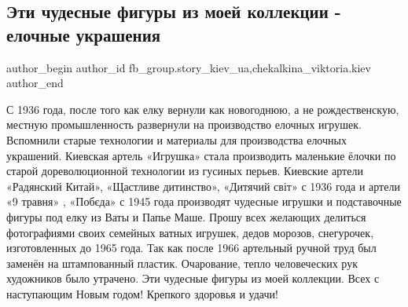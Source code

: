  
 
 
 
 
 
\subsection{Эти чудесные фигуры из моей коллекции - елочные украшения}
\label{sec:31_12_2021.fb.fb_group.story_kiev_ua.1.jolka_ukrashenia}
 
\ifcmt
 author_begin
   author_id fb_group.story_kiev_ua,chekalkina_viktoria.kiev
 author_end
\fi

С 1936 года, после того как елку вернули как новогоднюю, а не рождественскую,
местную промышленность развернули на производство елочных игрушек. Вспомнили
старые технологии и материалы для производства елочных украшений. Киевская
артель «Игрушка» стала производить маленькие ёлочки по старой дореволюционной
технологии из гусиных перьев. Киевские артели «Радянский Китай», «Щастливе
дитинство», «Дитячий світ» с 1936 года и артели «9 травня» , «Побєда» с 1945
года производят чудесные игрушки и подставочные фигуры под елку из Ваты и Папье
Маше.  Прошу всех желающих делиться фотографиями своих семейных ватных игрушек,
дедов морозов, снегурочек, изготовленных до 1965 года. Так как после 1966
артельный ручной труд был заменён на штампованный пластик. Очарование, тепло
человеческих рук художников было утрачено.  Эти чудесные фигуры из моей
коллекции. Всех с наступающим Новым годом! Крепкого здоровья и удачи!

